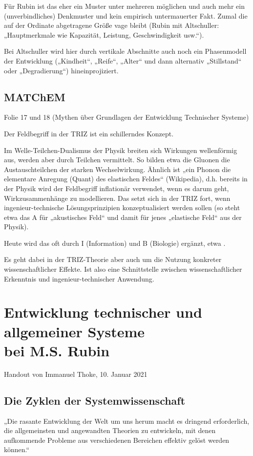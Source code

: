 \documentclass[a4paper,11pt]{article}
\begin{document}
Für Rubin ist das eher ein Muster unter mehreren möglichen und auch mehr ein
(unverbindliches) Denkmuster und kein empirisch untermauerter Fakt.  Zumal die
auf der Ordinate abgetragene Größe vage bleibt (Rubin mit Altschuller:
„Hauptmerkmale wie Kapazität, Leistung, Geschwindigkeit usw.“).

Bei Altschuller wird hier durch vertikale Abschnitte auch noch ein
Phasenmodell der Entwicklung („Kindheit“, „Reife“, „Alter“ und dann alternativ
„Stillstand“ oder „Degradierung“) hineinprojiziert.

\subsection*{MATChEM}

Folie 17 und 18 (Mythen über Grundlagen der Entwicklung Technischer Systeme)

Der Feldbegriff in der TRIZ ist ein schillerndes Konzept.

Im Welle-Teilchen-Dualismus der Physik breiten sich Wirkungen wellenförmig
aus, werden aber durch Teilchen vermittelt. So bilden etwa die Gluonen die
Austauschteilchen der starken Wechselwirkung. Ähnlich ist „ein Phonon die
elementare Anregung (Quant) des elastischen Feldes“ (Wikipedia), d.h.  bereits
in der Physik wird der Feldbegriff inflationär verwendet, wenn es darum geht,
Wirkzusammenhänge zu modellieren.  Das setzt sich in der TRIZ fort, wenn
ingenieur-technische Lösungsprinzipien konzeptualisiert werden sollen (so
steht etwa das A für „akustisches Feld“ und damit für jenes „elastische Feld“
aus der Physik).

Heute wird das oft durch I (Information) und B (Biologie) ergänzt, etwa
\cite{Belski2016}.

Es geht dabei in der TRIZ-Theorie aber auch um die Nutzung konkreter
wissenschaftlicher Effekte. Ist also eine Schnittstelle zwischen
wissenschaftlicher Erkenntnis und ingenieur-technischer Anwendung.

\section{Entwicklung technischer und allgemeiner Systeme\\ bei M.S. Rubin}
\begin{center}
  Handout von Immanuel Thoke, 10. Januar 2021
\end{center}

\subsection{Die Zyklen der Systemwissenschaft}
„Die rasante Entwicklung der Welt um uns herum macht es dringend erforderlich,
die allgemeinsten und angewandten Theorien zu entwickeln, mit denen
aufkommende Probleme aus verschiedenen Bereichen effektiv gelöst werden
können.“ \cite{Rubin2002}
\end{document}
